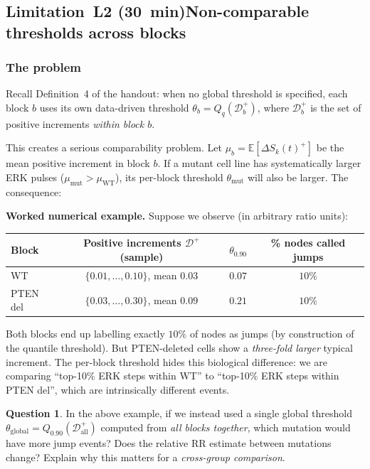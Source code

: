 \documentclass[11pt,a4paper]{article}
\theoremstyle{definition}
\newtheorem{question}{Question}
\newcommand{\dS}[2]{\Delta S_{#1}(#2)}
\newcommand{\RR}{\mathrm{RR}}
\newcommand{\1}[1]{\mathbf{1}\!\left[#1\right]}
\newcommand{\Thr}{\theta}
\begin{document}
\subsection*{Limitation~L2 (30~min)\quad Non-comparable thresholds across blocks}

\subsubsection*{The problem}

Recall Definition~4 of the handout: when no global threshold is specified,
each block $b$ uses its own data-driven threshold
$\Thr_b = Q_q(\mathcal{D}_b^+)$,
where $\mathcal{D}_b^+$ is the set of positive increments \emph{within block $b$}.

This creates a serious comparability problem.
Let $\mu_b = \mathbb{E}[\dS{k}{t}^+]$ be the mean positive increment in
block $b$.
If a mutant cell line has systematically larger ERK pulses
($\mu_{\mathrm{mut}} > \mu_{\mathrm{WT}}$), its per-block threshold
$\Thr_{\mathrm{mut}}$ will also be larger.
The consequence:

\medskip
\noindent\textbf{Worked numerical example.}
Suppose we observe (in arbitrary ratio units):

\begin{center}
\renewcommand{\arraystretch}{1.3}
\begin{tabular}{lccc}
\toprule
Block & Positive increments $\mathcal{D}^+$ (sample) & $\Thr_{0.90}$ & \% nodes called jumps \\
\midrule
WT           & $\{0.01,\ldots,0.10\}$, mean $0.03$ & $0.07$ & $10\%$ \\
PTEN del     & $\{0.03,\ldots,0.30\}$, mean $0.09$ & $0.21$ & $10\%$ \\
\bottomrule
\end{tabular}
\end{center}

Both blocks end up labelling exactly $10\%$ of nodes as jumps (by
construction of the quantile threshold).
But PTEN-deleted cells show a \emph{three-fold larger} typical increment.
The per-block threshold hides this biological difference: we are comparing
``top-10\% ERK steps within WT'' to ``top-10\% ERK steps within PTEN del'',
which are intrinsically different events.

\begin{question}
In the above example, if we instead used a single global threshold
$\Thr_{\mathrm{global}} = Q_{0.90}(\mathcal{D}_{\mathrm{all}}^+)$
computed from \emph{all blocks together}, which mutation would have more
jump events?
Does the relative $\RR$ estimate between mutations change?
Explain why this matters for a \emph{cross-group comparison}.

\end{question}
\end{document}
